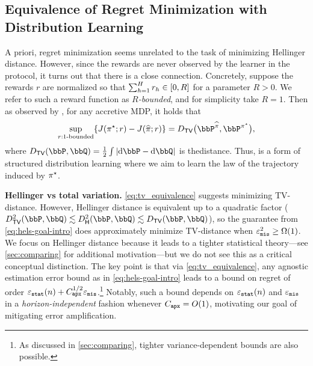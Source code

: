   
  



%
\subsection{Equivalence of Regret Minimization with Distribution Learning}\label{sec:regret-vs-learning}


A priori, regret minimization seems unrelated to the task of minimizing Hellinger distance. %
However, since the
rewards are never observed by the learner in the \IL{}{} protocol, it turns out that there is a close connection.
Concretely, suppose the rewards $r$ are normalized so that
$\sum_{h=1}^{H}r_h\in\brk*{0,R}$ for a parameter $R>0$. We refer to
such a reward function as \emph{$R$-bounded}, and for simplicity take $R=1$. Then as observed by \cite{foster2024behavior}, for any accretive MDP, it holds that %
\begin{align}
  \label{eq:tv_equivalence}
  \sup_{r: \text{$1$-bounded}}
  \crl*{J(\pistar;r) - J(\pihat;r)}
  = \DtvX{\big}{\bbP^{\pihat}}{\bbP^{\pistar}},
\end{align}
where
$\Dtv{\bbP}{\bbQ}=\frac{1}{2}\int\abs{\mathrm{d}\bbP-\mathrm{d}\bbQ}$
is thedistance. Thus, \IL{}{} is a form of structured distribution learning where we aim
to learn the law of the trajectory induced by $\pistar$.


\vspace{0.3em}
\noindent\textbf{Hellinger vs total variation.} \cref{eq:tv_equivalence} suggests minimizing TV-distance. However, 
Hellinger distance is
equivalent up to a quadratic factor
($\Dtvs{\bbP}{\bbQ}\approxleq\Dhels{\bbP}{\bbQ}\approxleq\Dtv{\bbP}{\bbQ}$),
so the guarantee from \cref{eq:hels-goal-intro} does
approximately minimize TV-distance when $\vepsmis^2 \geq
\Omega(1)$. We focus on Hellinger distance because it leads to a tighter statistical theory---see \cref{sec:comparing} for additional motivation---but we do not see this as a critical conceptual distinction. The key point is that via \cref{eq:tv_equivalence}, any agnostic estimation error bound
as in \cref{eq:hels-goal-intro} leads to a bound on regret of order
$\vepsstat(n) + \Capx^{1/2}\vepsmis$.\footnote{As discussed in \cref{sec:comparing}, tighter variance-dependent bounds are also possible.} Notably, such a bound depends on
$\vepsstat(n)$ and $\vepsmis$ in a \emph{horizon-independent} fashion
whenever $\Capx=\bigoh(1)$, motivating our goal of mitigating error amplification. %


